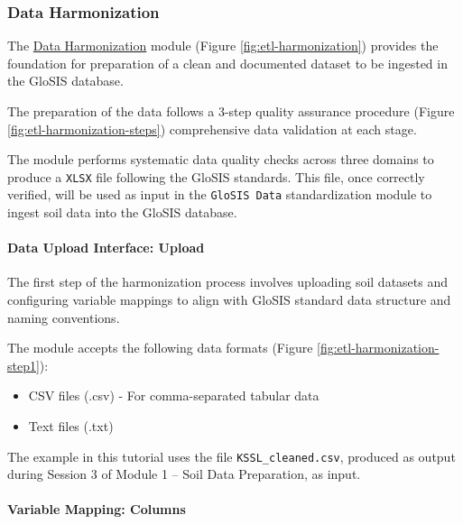 \documentclass[
  10pt,
  b5paper,
  oneside]{book}
\providecommand{\tightlist}{%
  \setlength{\itemsep}{0pt}\setlength{\parskip}{0pt}}
\begin{document}
\subsubsection{Data Harmonization}\label{data-harmonization}

The \href{http://localhost:3000/harmonization}{Data Harmonization} module (Figure \ref{fig:etl-harmonization}) provides the foundation for preparation of a clean and documented dataset to be ingested in the GloSIS database.

The preparation of the data follows a 3-step quality assurance procedure (Figure \ref{fig:etl-harmonization-steps}) comprehensive data validation at each stage.

The module performs systematic data quality checks across three domains to produce a \texttt{XLSX} file following the GloSIS standards. This file, once correctly verified, will be used as input in the \texttt{GloSIS\ Data} standardization module to ingest soil data into the GloSIS database.

\paragraph*{Data Upload Interface: Upload}\label{data-upload-interface-upload}

The first step of the harmonization process involves uploading soil datasets and configuring variable mappings to align with GloSIS standard data structure and naming conventions.

The module accepts the following data formats (Figure \ref{fig:etl-harmonization-step1}):

\begin{itemize}
\tightlist
\item
  CSV files (.csv) - For comma-separated tabular data
\item
  Text files (.txt)
\end{itemize}

The example in this tutorial uses the file \texttt{KSSL\_cleaned.csv}, produced as output during Session 3 of Module 1 -- Soil Data Preparation, as input.

\paragraph*{Variable Mapping: Columns}\label{variable-mapping-columns}
\end{document}
